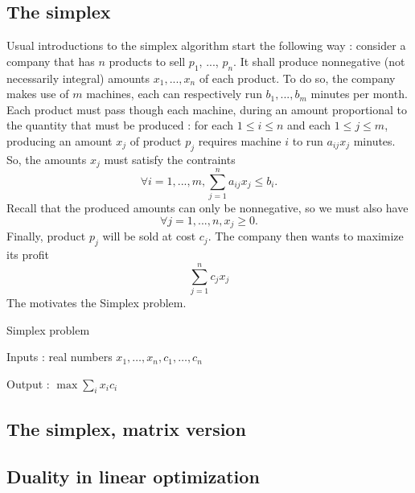 \subsection{The simplex}
Usual introductions to the simplex algorithm start the following way : consider a company that has $n$ products to sell $p_1$, ..., $p_n$. It shall produce nonnegative (not necessarily integral) amounts $x_1,...,x_n$ of each product. To do so, the company makes use of $m$ machines, each can respectively run $b_1, ..., b_m$ minutes per month. Each product must pass though each machine, during an amount proportional to the quantity that must be produced : for each $1\le i\le n$ and each $1\le j\le m$, producing an amount $x_j$ of product $p_j$ requires machine $i$ to run $a_{ij}x_j$ minutes. So, the amounts $x_j$ must satisfy the contraints
\[
    \forall i=1,...,m, \sum_{j=1}^n a_{ij} x_j \leqslant b_i.
\]
Recall that the produced amounts can only be nonnegative, so we must also have
\[
    \forall j=1,...,n, x_j \geqslant 0.
\]
Finally, product $p_j$ will be sold at cost $c_j$. The company then wants to maximize its profit
\[
    \sum_{j=1}^n c_j x_j
\]
The motivates the Simplex problem.

\begin{problem}[pb]
Simplex problem

Inputs : real numbers $x_1,\ldots,x_n, c_1,\ldots,c_n$

Output : $ \displaystyle \max \sum_i x_i c_i$
\end{problem}

\subsection{The simplex, matrix version}
\subsection{Duality in linear optimization}